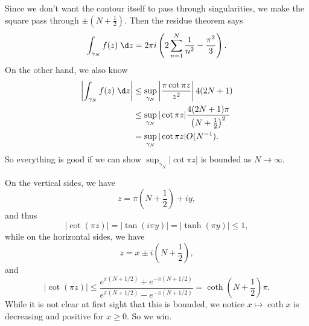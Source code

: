 \documentclass[a4paper]{article}
\begin{document}
\begin{eg}
\begin{center}
  \end{center}
  Since we don't want the contour itself to pass through singularities, we make the square pass through $\pm\left(N + \frac{1}{2}\right)$. Then the residue theorem says
  \[
    \int_{\gamma_N}f(z) \;\d z = 2\pi i\left(2 \sum_{n = 1}^N \frac{1}{n^2} - \frac{\pi^2}{3}\right).
  \]
  On the other hand, we also know
  \begin{align*}
    \left|\int_{\gamma_N} f(z)\;\d z \right| &\leq \sup_{\gamma_N} \left|\frac{\pi \cot \pi z}{z^2}\right| 4(2N + 1)\\
    &\leq \sup_{\gamma_N} |\cot \pi z| \frac{4(2N + 1)\pi}{\left(N + \frac{1}{2}\right)^2}\\
    &= \sup_{\gamma_N} |\cot \pi z| O(N^{-1}).
  \end{align*}
  So everything is good if we can show $\sup_{\gamma_N} |\cot \pi z|$ is bounded as $N \to \infty$.

  On the vertical sides, we have
  \[
    z = \pi \left(N + \frac{1}{2}\right) + iy,
  \]
  and thus
  \[
    |\cot (\pi z)| = |\tan(i \pi y)| = |\tanh (\pi y)| \leq 1,
  \]
  while on the horizontal sides, we have
  \[
    z = x \pm i\left(N + \frac{1}{2}\right),
  \]
  and
  \[
    |\cot (\pi z)| \leq \frac{e^{\pi(N + 1/2)} + e^{-\pi(N + 1/2)}}{e^{\pi(N + 1/2)} - e^{-\pi(N + 1/2)}} = \coth\left(N + \frac{1}{2}\right)\pi.
  \]
  While it is not clear at first sight that this is bounded, we notice $x \mapsto \coth x$ is decreasing and positive for $x \geq 0$. So we win.
\end{eg}
\end{document}
